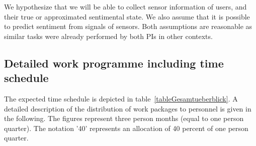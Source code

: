 \documentclass[12pt]{article}
\begin{document}
We hypothesize that we will be able to collect sensor information of users, and their true or approximated sentimental state. We also assume that it is possible to predict sentiment from signals of sensors. Both assumptions are reasonable as similar tasks were  already performed by both PIs in other contexts. 

\subsection*{Detailed work programme including time schedule}
The expected time schedule is depicted in table~\ref{tableGesamtueberblick}. 
A detailed description of the distribution of work packages to personnel is given in the following.
The figures represent three person months (equal to one person quarter).
The notation '40' represents an allocation of 40 percent of one person quarter. 
\end{document}
